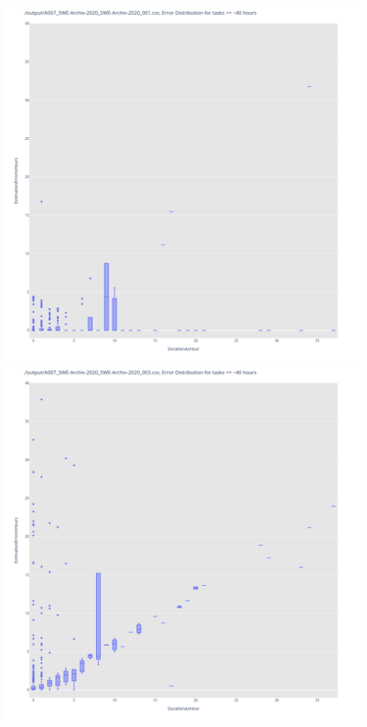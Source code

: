 \includegraphics[width=\textwidth]{Scripts/output/A007_SWE-Archiv-2020_SWE-Archiv-2020_001.csv.error_distribution.png}
\includegraphics[width=\textwidth]{Scripts/output/A007_SWE-Archiv-2020_SWE-Archiv-2020_003.csv.error_distribution.png}
